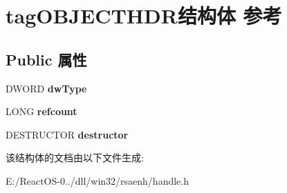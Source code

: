 \hypertarget{structtag_o_b_j_e_c_t_h_d_r}{}\section{tag\+O\+B\+J\+E\+C\+T\+H\+D\+R结构体 参考}
\label{structtag_o_b_j_e_c_t_h_d_r}
\subsection*{Public 属性}
\begin{DoxyCompactItemize}
\item 
\mbox{\label{structtag_o_b_j_e_c_t_h_d_r_a52483e7c9498d708a5434f91a4d6e6e9}} 
D\+W\+O\+RD {\bfseries dw\+Type}
\item 
\mbox{\label{structtag_o_b_j_e_c_t_h_d_r_acdf2fb6892a0d39e56d2c95c44960a26}} 
L\+O\+NG {\bfseries refcount}
\item 
\mbox{\label{structtag_o_b_j_e_c_t_h_d_r_ad3c814c1f5c8afa592c8927ea1af1483}} 
D\+E\+S\+T\+R\+U\+C\+T\+OR {\bfseries destructor}
\end{DoxyCompactItemize}


该结构体的文档由以下文件生成\+:\begin{DoxyCompactItemize}
\item 
E\+:/\+React\+O\+S-\/0../dll/win32/rsaenh/handle.\+h\end{DoxyCompactItemize}
